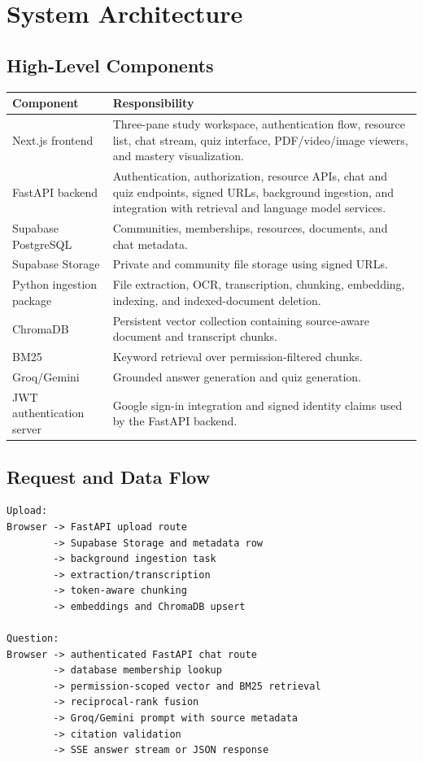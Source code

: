 \documentclass[11pt,a4paper]{article}
\begin{document}
\section{System Architecture}

\subsection{High-Level Components}

\begin{longtable}{p{}p{}}
\toprule
\textbf{Component} & \textbf{Responsibility} \\
\midrule
Next.js frontend & Three-pane study workspace, authentication flow,
resource list, chat stream, quiz interface, PDF/video/image viewers, and
mastery visualization. \\
FastAPI backend & Authentication, authorization, resource APIs, chat and quiz
endpoints, signed URLs, background ingestion, and integration with retrieval
and language model services. \\
Supabase PostgreSQL & Communities, memberships, resources, documents, and chat
metadata. \\
Supabase Storage & Private and community file storage using signed URLs. \\
Python ingestion package & File extraction, OCR, transcription, chunking,
embedding, indexing, and indexed-document deletion. \\
ChromaDB & Persistent vector collection containing source-aware document and
transcript chunks. \\
BM25 & Keyword retrieval over permission-filtered chunks. \\
Groq/Gemini & Grounded answer generation and quiz generation. \\
JWT authentication server & Google sign-in integration and signed identity
claims used by the FastAPI backend. \\
\bottomrule
\end{longtable}

\subsection{Request and Data Flow}

\begin{lstlisting}[language={},caption={Upload and question-answering flow}]
Upload:
Browser -> FastAPI upload route
        -> Supabase Storage and metadata row
        -> background ingestion task
        -> extraction/transcription
        -> token-aware chunking
        -> embeddings and ChromaDB upsert

Question:
Browser -> authenticated FastAPI chat route
        -> database membership lookup
        -> permission-scoped vector and BM25 retrieval
        -> reciprocal-rank fusion
        -> Groq/Gemini prompt with source metadata
        -> citation validation
        -> SSE answer stream or JSON response
\end{lstlisting}
\end{document}

